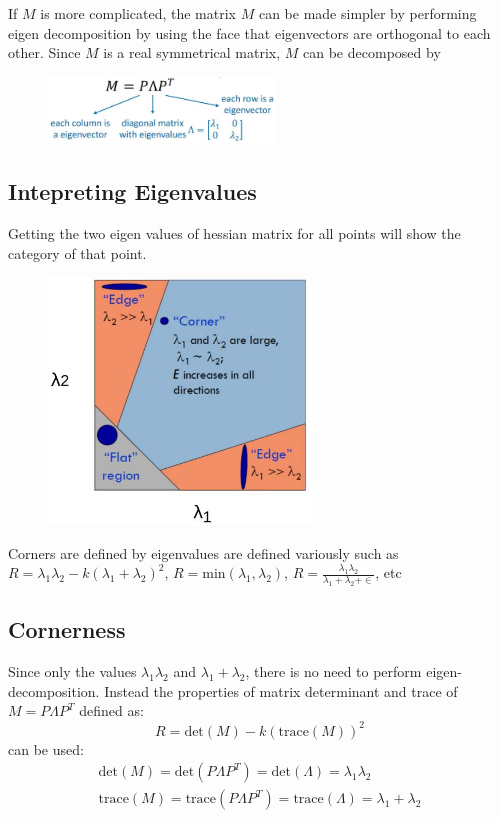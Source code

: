 \documentclass{report}
\begin{document}
If $M$ is more complicated, the matrix $M$ can be made simpler by performing
eigen decomposition by using the face that eigenvectors are orthogonal to each
other. Since $M$ is a real symmetrical matrix, $M$ can be
decomposed by 
\begin{figure}[h]
    \centering
    \includegraphics[width=6cm]{decomposition.JPG}
\end{figure}

\pagebreak
\subsection{Intepreting Eigenvalues}

Getting the two eigen values of hessian matrix for all points will show the
category of that point.  
\begin{figure}[h]
    \centering
    \includegraphics[width=7cm]{Corner eigen.JPG}
\end{figure}

Corners are defined by eigenvalues are defined variously such as $R = \lambda_1
\lambda_2 - k(\lambda_1 + \lambda_2)^2$, $R = \text{min}(\lambda_1, \lambda_2)$,
$R= \frac{\lambda_1 \lambda_2}{\lambda_1 + \lambda_2 + \in}$, etc

\subsection{Cornerness}

Since only the values $\lambda_1 \lambda_2$ and $\lambda_1 + \lambda_2$, there
is no need to perform eigen-decomposition. Instead the properties of matrix
determinant and trace of $M = P \Lambda P^T$ defined as:
$$
    R = \text{det}(M) - k(\text{trace}(M))^2
$$
can be used:
\begin{gather*}
    \text{det}(M) = \text{det}(P \Lambda P^T) = \text{det}(\Lambda) = \lambda_1 \lambda_2 \\ 
    \text{trace}(M) = \text{trace}(P \Lambda P^T) = \text{trace}(\Lambda) = \lambda_1 + \lambda_2
\end{gather*} 
\end{document}
